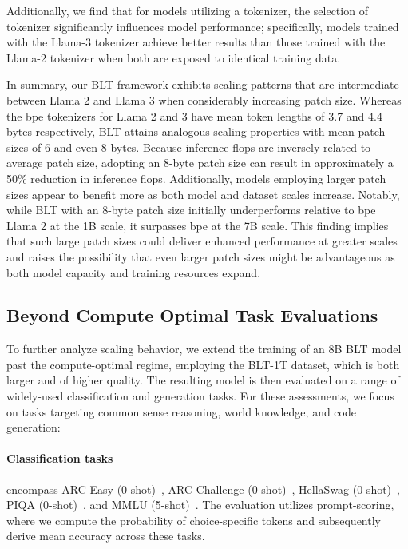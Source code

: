 Additionally, we find that for models utilizing a tokenizer, the selection of tokenizer significantly influences model performance; specifically, models trained with the Llama-3 tokenizer achieve better results than those trained with the Llama-2 tokenizer when both are exposed to identical training data.

In summary, our {\textsc BLT} framework exhibits scaling patterns that are intermediate between Llama 2 and Llama 3 when considerably increasing patch size. Whereas the bpe tokenizers for Llama 2 and 3 have mean token lengths of 3.7 and 4.4 bytes respectively, {\textsc BLT} attains analogous scaling properties with mean patch sizes of 6 and even 8 bytes. Because inference flops are inversely related to average patch size, adopting an 8-byte patch size can result in approximately a 50\% reduction in inference flops. Additionally, models employing larger patch sizes appear to benefit more as both model and dataset scales increase. Notably, while {\textsc BLT} with an 8-byte patch size initially underperforms relative to bpe Llama 2 at the 1B scale, it surpasses bpe at the 7B scale. This finding implies that such large patch sizes could deliver enhanced performance at greater scales and raises the possibility that even larger patch sizes might be advantageous as both model capacity and training resources expand.

\subsection{Beyond Compute Optimal Task Evaluations}
\label{section:evals}
To further analyze scaling behavior, we extend the training of an 8B {\textsc BLT} model past the compute-optimal regime, employing the {\textsc BLT}-1T dataset, which is both larger and of higher quality. The resulting model is then evaluated on a range of widely-used classification and generation tasks. For these assessments, we focus on tasks targeting common sense reasoning, world knowledge, and code generation:

\paragraph{Classification tasks} encompass ARC-Easy (0-shot)~\citep{Eval_ARC}, ARC-Challenge (0-shot)~\citep{Eval_ARC}, HellaSwag (0-shot)~\citep{Eval_hellaswag}, PIQA (0-shot)~\citep{Eval_piqa}, and MMLU (5-shot)~\citep{hendrycks2020measuring}. The evaluation utilizes prompt-scoring, where we compute the probability of choice-specific tokens and subsequently derive mean accuracy across these tasks.

